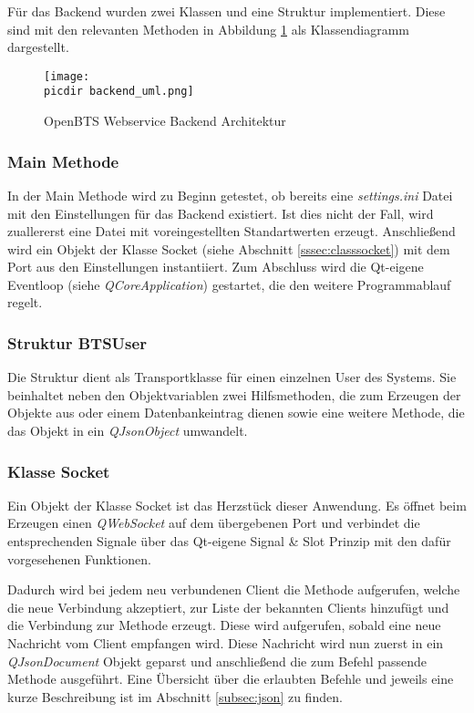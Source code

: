 Für das Backend wurden zwei Klassen und eine Struktur implementiert. Diese sind mit den relevanten Methoden in Abbildung \ref{fig:uml_class} als \UML Klassendiagramm dargestellt.
\begin{figure}[h!]
	\centering
	\texttt{[image: \\picdir backend\_uml.png]}
	\caption{\acs*{OpenBTS} Webservice Backend Architektur}
	\label{fig:uml_class}
\end{figure}

\subsubsection*{Main Methode}

In der Main Methode wird zu Beginn getestet, ob bereits eine \textit{settings.ini} Datei mit den Einstellungen für das Backend existiert. Ist dies nicht der Fall, wird zuallererst eine Datei mit voreingestellten Standartwerten erzeugt. Anschließend wird ein Objekt der Klasse Socket (siehe Abschnitt \ref{sssec:classsocket}) mit dem Port aus den Einstellungen instantiiert. Zum Abschluss wird die Qt-eigene Eventloop (siehe \textit{QCoreApplication}) gestartet, die den weitere Programmablauf regelt.

\subsubsection*{Struktur BTSUser}
Die Struktur dient als Transportklasse für einen einzelnen User des \OpenBTS Systems. Sie beinhaltet neben den Objektvariablen zwei Hilfsmethoden, die zum Erzeugen der Objekte aus \JSON oder einem Datenbankeintrag dienen sowie eine weitere Methode, die das Objekt in ein \textit{QJsonObject} umwandelt.


\subsubsection*{Klasse Socket}
\label{sssec:classsocket}
Ein Objekt der Klasse Socket ist das Herzstück dieser Anwendung. Es öffnet beim Erzeugen einen \textit{QWebSocket} auf dem übergebenen Port und verbindet die entsprechenden Signale über das Qt-eigene Signal \& Slot Prinzip mit den dafür vorgesehenen Funktionen.

Dadurch wird bei jedem neu verbundenen Client die Methode  aufgerufen, welche die neue Verbindung akzeptiert, zur Liste der bekannten Clients hinzufügt und die Verbindung zur  Methode erzeugt. Diese wird aufgerufen, sobald eine neue Nachricht vom Client empfangen wird. Diese Nachricht wird nun zuerst in ein \textit{QJsonDocument} Objekt geparst und anschließend die zum Befehl passende Methode ausgeführt. Eine Übersicht über die erlaubten Befehle und jeweils eine kurze Beschreibung ist im Abschnitt \ref{subsec:json} zu finden.


